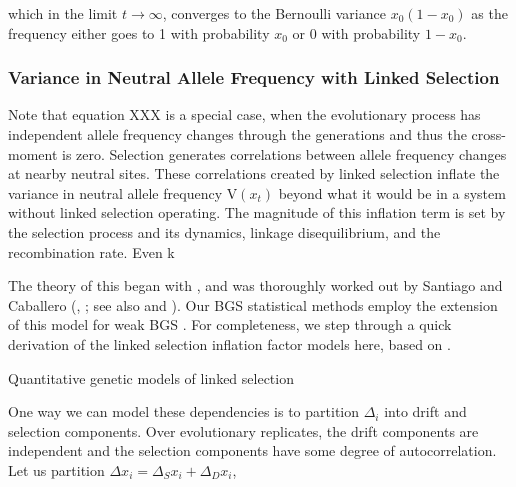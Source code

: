 \documentclass[11pt]{article}
\newcommand{\V}{\text{V}}
\begin{document}
which in the limit $t \to \infty$, converges to the Bernoulli variance
$x_0(1-x_0)$ as the frequency either goes to 1 with probability $x_0$ or 0 with
probability $1-x_0$.




\subsubsection*{Variance in Neutral Allele Frequency with Linked Selection}

Note that equation XXX is a special case, when the evolutionary process has
independent allele frequency changes through the generations and thus the
cross-moment is zero. Selection generates correlations between allele frequency
changes at nearby neutral sites. These correlations created by linked selection
inflate the variance in neutral allele frequency $\V(x_t)$ beyond what it would
be in a system without linked selection operating. The magnitude of this
inflation term is set by the selection process and its dynamics, linkage
disequilibrium, and the recombination rate. Even k




The theory of this began with \textcite{Robertson1961-ho},
and was thoroughly worked out by Santiago and Caballero
(\citeyear{Santiago1995-hx}, \citeyear{Santiago1998-bs}; see also
\cite{Barton2000-zg} and \cite{Buffalo2019-qs}). Our BGS statistical methods
employ the extension of this model for weak BGS \parencite{Santiago2016-mu}.
For completeness, we step through a quick derivation of the linked selection
inflation factor models here, based on
\textcite{Santiago1995-hx,Santiago1998-bs}.

Quantitative genetic models of linked selection




One way we can model these dependencies is to partition $\Delta_i$ into drift
and selection components. Over evolutionary replicates, the drift components
are independent and the selection components have some degree of
autocorrelation. Let us partition $\Delta x_i = \Delta_S x_i + \Delta_D x_i$,
\end{document}
